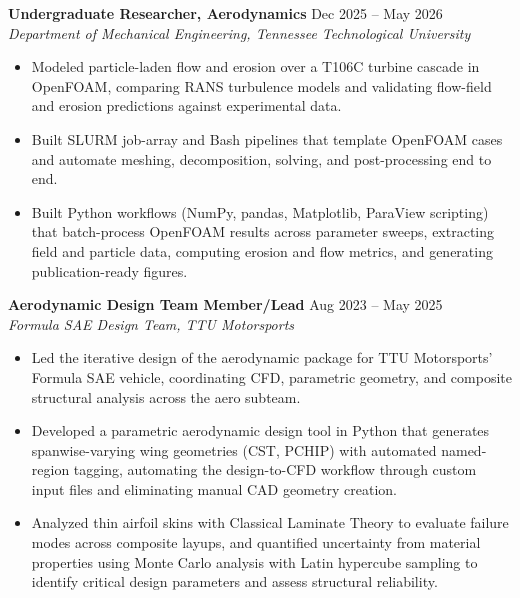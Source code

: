 \documentclass[12.0pt,letterpaper]{article}
\newcommand{\entryheader}[3]{%
    \textbf{#1} \hfill #2\\
    \textit{#3}
}
\begin{document}
\entryheader{Undergraduate Researcher, Aerodynamics}{Dec 2025 -- May 2026}{Department of Mechanical Engineering, Tennessee Technological University}
\vspace{4pt}
\begin{itemize}
        \item Modeled particle-laden flow and erosion over a T106C turbine cascade in OpenFOAM, comparing RANS turbulence models and validating flow-field and erosion predictions against experimental data.
        
	\item Built SLURM job-array and Bash pipelines that template OpenFOAM cases and automate meshing, decomposition, solving, and post-processing end to end.
	\item Built Python workflows (NumPy, pandas, Matplotlib, ParaView scripting) that batch-process OpenFOAM results across parameter sweeps, extracting field and particle data, computing erosion and flow metrics, and generating publication-ready figures.
	
\end{itemize}
\vspace{15pt}

\entryheader{Aerodynamic Design Team Member/Lead}{Aug 2023 -- May 2025}{Formula SAE Design Team, TTU Motorsports}
\vspace{4pt}
\begin{itemize}
\item Led the iterative design of the aerodynamic package for TTU Motorsports' Formula SAE vehicle, coordinating CFD, parametric geometry, and composite structural analysis across the aero subteam.
\item Developed a parametric aerodynamic design tool in Python that generates spanwise-varying wing geometries (CST, PCHIP) with automated named-region tagging, automating the design-to-CFD workflow through custom input files and eliminating manual CAD geometry creation.
\item Analyzed thin airfoil skins with Classical Laminate Theory to evaluate failure modes across composite layups, and quantified uncertainty from material properties using Monte Carlo analysis with Latin hypercube sampling to identify critical design parameters and assess structural reliability.
\end{itemize}
\end{document}
